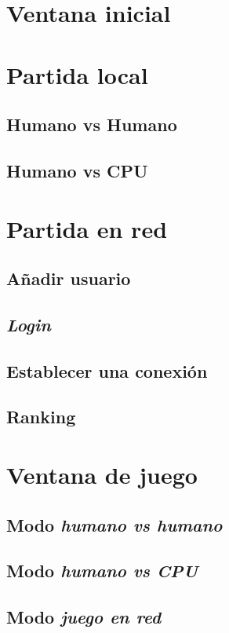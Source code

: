 \section{Ventana inicial}

\section{Partida local}
\subsection{Humano vs Humano}

\subsection{Humano vs CPU}

\section{Partida en red}
\subsection{Añadir usuario}

\subsection{\emph{Login}}

\subsection{Establecer una conexión}

\subsection{Ranking}

\section{Ventana de juego}
\subsection{Modo \emph{humano vs humano}}

\subsection{Modo \emph{humano vs CPU}}

\subsection{Modo \emph{juego en red}}

